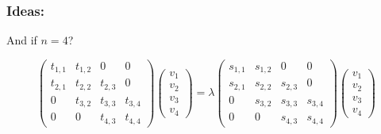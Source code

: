 \documentclass{beamer}
\theoremstyle{definition} \newtheorem{de}{Def}
\theoremstyle{remark} \newtheorem{os}[de]{Remark}
\theoremstyle{plain} \newtheorem{te}[de]{Teo}
\theoremstyle{plain} \newtheorem{co}[de]{Cor}
\theoremstyle{plain} \newtheorem{pr}[de]{Prop}
\theoremstyle{plain} \newtheorem{lem}[de]{Lemm}
\theoremstyle{remark} \newtheorem{rem}[de]{Remark}
\begin{document}
\begin{frame}
  \frametitle{Ideas:}

  And if $n=4$?
  
  \begin{equation*}
    \begin{pmatrix}
      t_{1,1} & t_{1,2} & 0 & 0\\
      t_{2,1} & t_{2,2} & t_{2,3} & 0\\
      0 & t_{3,2} & t_{3,3} & t_{3,4}\\
      0 & 0 & t_{4,3} & t_{4,4}
    \end{pmatrix} \begin{pmatrix} 
      v_1 \\ 
      v_2 \\
      v_3 \\
      v_4
    \end{pmatrix} = \lambda \begin{pmatrix}
      s_{1,1} & s_{1,2} & 0 & 0\\
      s_{2,1} & s_{2,2} & s_{2,3} & 0\\
      0 & s_{3,2} & s_{3,3} & s_{3,4}\\
      0 & 0 & s_{4,3} & s_{4,4}
    \end{pmatrix} \begin{pmatrix}
      v_1 \\ 
      v_2 \\
      v_3 \\
      v_4
    \end{pmatrix}
  \end{equation*}

\end{frame}
\end{document}
